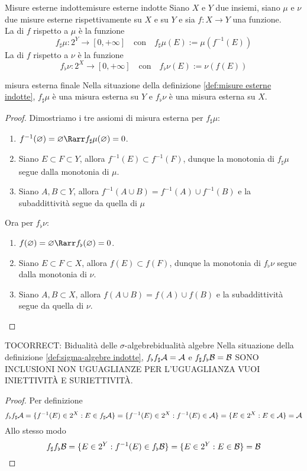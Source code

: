 \documentclass{article}
\renewcommand\A{\mc{A}}
\begin{document}
\begin{definition}{Misure esterne indotte}{misure esterne indotte}
    Siano $X$ e $Y$ due insiemi, siano $\mu$ e $\nu$ due misure esterne rispettivamente su $X$ e su $Y$ e sia $f:X\to Y$ una funzione.\\
    La  di $f$ rispetto a $\mu$ è la funzione
    \[f_\sharp\mu : 2^Y \to [0,+\infty] \quad \text{con} \quad f_\sharp\mu(E):= \mu(f^{-1}(E)) \]
    La  di $f$ rispetto a $\nu$ è la funzione
    \[f_\flat\nu : 2^X \to [0,+\infty] \quad \text{con} \quad f_\flat\nu(E) := \nu(f(E))\]
\end{definition}
\begin{proposition}{}{misura esterna finale}
    Nella situazione della definizione \ref{def:misure esterne indotte}, $f_\sharp\mu$ è una misura esterna su $Y$ e $f_\flat\nu$ è una misura esterna su $X$.
    \begin{proof}
        Dimostriamo i tre assiomi di misura esterna per $f_\sharp\mu$:\begin{enumerate}
            \item $f^{-1}(\varnothing) = \varnothing \Rarr f_\sharp\mu(\varnothing) = 0$.
            \item Siano $E \subset F \subset Y$, allora $f^{-1}(E)\subset f^{-1}(F)$, dunque la monotonia di $f_\sharp\mu$ segue dalla monotonia di $\mu$.
            \item Siano $A,B \subset Y$, allora $f^{-1}(A\cup B)= f^{-1}(A) \cup f^{-1}(B)$ e la subaddittività segue da quella di $\mu$
        \end{enumerate}
        Ora per $f_\flat\nu$:\begin{enumerate}
            \item $f(\varnothing) = \varnothing \Rarr f_\flat(\varnothing) = 0$.
            \item Siano $E \subset F \subset X$, allora $f(E)\subset f(F)$, dunque la monotonia di $f_\flat\nu$ segue dalla monotonia di $\nu$.
            \item Siano $A,B \subset X$, allora $f(A \cup B) = f(A)\cup f(B)$ e la subaddittività segue da quella di $\nu$.
        \end{enumerate}
    \end{proof}
\end{proposition}

\begin{remark}{TOCORRECT: Bidualità delle $\sigma$-algebre}{bidualità algebre}
    Nella situazione della definizione \ref{def:sigma-algebre indotte}, $f_\flat f_\sharp \A = \A$ e $f_\sharp f_\flat \mathcal{B} = \mathcal{B}$ SONO INCLUSIONI NON UGUAGLIANZE PER L'UGUAGLIANZA VUOI INIETTIVITÀ E SURIETTIVITÀ.
    \begin{proof}
        Per definizione
        \[f_\flat f_\sharp \A = \{ f^{-1}(E) \in 2^X : E \in f_\sharp \A\} = \{f^{-1}(E) \in 2^X : f^{-1}(E) \in \A\} = \{E \in 2^X : E \in \A\} = \A\]
        Allo stesso modo
        \[f_\sharp f_\flat \mathcal{B} = \{ E \in 2^Y : f^{-1}(E) \in f_\flat \mathcal{B} \} = \{ E \in 2^Y : E \in \mathcal{B}\} = \mathcal{B}\]
    \end{proof}
\end{remark}
\end{document}
